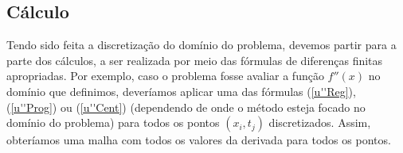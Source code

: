             \subsection{Cálculo}
            
                Tendo sido feita a discretização do domínio do problema, devemos partir para a parte dos cálculos, a ser realizada por meio das fórmulas de diferenças finitas apropriadas. Por exemplo, caso o problema fosse avaliar a função $f''(x)$ no domínio que definimos, deveríamos aplicar uma das fórmulas (\ref{u''Reg}), (\ref{u''Prog}) ou (\ref{u''Cent}) (dependendo de onde o método esteja focado no domínio do problema) para todos os pontos $(x_i, t_j)$ discretizados. Assim, obteríamos uma malha com todos os valores da derivada para todos os pontos.